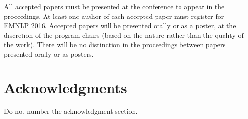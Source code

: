 \documentclass[11pt,letterpaper]{article}
\begin{document}
All accepted papers must be presented at the conference to appear in the
proceedings. At least one author of each accepted paper must register for EMNLP
2016. Accepted papers will be presented orally or as a poster, at the discretion
of the program chairs (based on the nature rather than the quality of the work).
There will be no distinction in the proceedings between papers presented orally
or as posters.

\section*{Acknowledgments}

Do not number the acknowledgment section.



\end{document}
